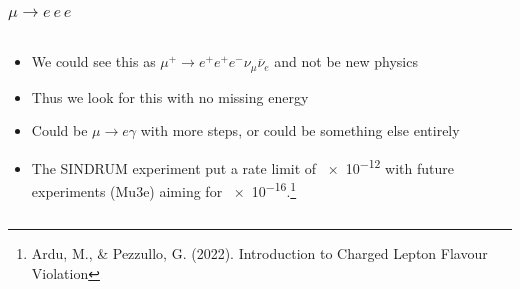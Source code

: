 \documentclass[11pt]{beamer}
\begin{document}
\begin{frame}
    \frametitle{$\mu\rightarrow e\,e\,e$}
    \begin{columns}[c]
        \begin{column}{0.6\textwidth}
            \begin{itemize}
                \item We could see this as $\mu^+\rightarrow e^+ e^+ e^- \nu_\mu \overline{\nu}_e$ and not be new physics
                \item Thus we look for this with no missing energy
                \item Could be $\mu \rightarrow e\gamma$ with more steps, or could be something else entirely
                \item The SINDRUM experiment put a rate limit of \num{e-12} with future experiments (Mu3e) aiming for \num{e-16}.\footnote[frame]{Ardu, M., \& Pezzullo, G. (2022). Introduction to Charged Lepton Flavour Violation}
            \end{itemize}
        \end{column}

        \begin{column}{0.4\textwidth}
            \bigskip


\end{column}
\end{columns}
\end{frame}
\end{document}

